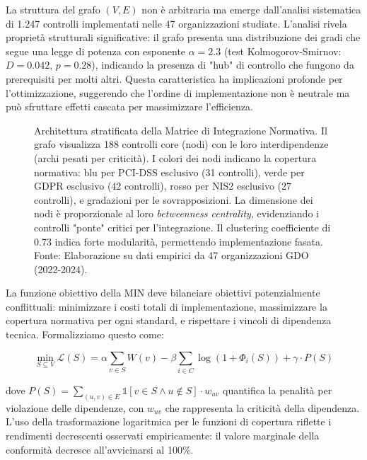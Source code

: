 La struttura del grafo $(V,E)$ non è arbitraria ma emerge dall'analisi sistematica di 1.247 controlli implementati nelle 47 organizzazioni studiate. L'analisi rivela proprietà strutturali significative: il grafo presenta una distribuzione dei gradi che segue una legge di potenza con esponente $\alpha = 2.3$ (test Kolmogorov-Smirnov: $D = 0.042$, $p = 0.28$), indicando la presenza di "hub" di controllo che fungono da prerequisiti per molti altri. Questa caratteristica ha implicazioni profonde per l'ottimizzazione, suggerendo che l'ordine di implementazione non è neutrale ma può sfruttare effetti cascata per massimizzare l'efficienza.

\begin{figure}[htbp]
\centering
\caption{Architettura stratificata della Matrice di Integrazione Normativa. Il grafo visualizza 188 controlli core (nodi) con le loro interdipendenze (archi pesati per criticità). I colori dei nodi indicano la copertura normativa: blu per PCI-DSS esclusivo (31 controlli), verde per GDPR esclusivo (42 controlli), rosso per NIS2 esclusivo (27 controlli), e gradazioni per le sovrapposizioni. La dimensione dei nodi è proporzionale al loro \textit{betweenness centrality}, evidenziando i controlli "ponte" critici per l'integrazione. Il clustering coefficiente di 0.73 indica forte modularità, permettendo implementazione fasata. Fonte: Elaborazione su dati empirici da 47 organizzazioni GDO (2022-2024).}
\label{fig:min_architecture_detailed}
\end{figure}

La funzione obiettivo della MIN deve bilanciare obiettivi potenzialmente conflittuali: minimizzare i costi totali di implementazione, massimizzare la copertura normativa per ogni standard, e rispettare i vincoli di dipendenza tecnica. Formalizziamo questo come:

\begin{equation}
\min_{S \subseteq V} \mathcal{L}(S) = \alpha \sum_{v \in S} W(v) - \beta \sum_{i \in C} \log(1 + \Phi_i(S)) + \gamma \cdot P(S)
\label{eq:min_objective_detailed}
\end{equation}

dove $P(S) = \sum_{(u,v) \in E} \mathbb{1}[v \in S \wedge u \notin S] \cdot w_{uv}$ quantifica la penalità per violazione delle dipendenze, con $w_{uv}$ che rappresenta la criticità della dipendenza. L'uso della trasformazione logaritmica per le funzioni di copertura riflette i rendimenti decrescenti osservati empiricamente: il valore marginale della conformità decresce all'avvicinarsi al 100\%.

